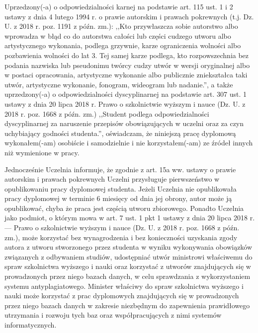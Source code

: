 \documentclass[11pt]{aghdpl}
\begin{document}
{\sf Uprzedzony(-a) o odpowiedzialności karnej na podstawie art. 115 ust. 1 i 2 ustawy z dnia 4 lutego 1994 r. o prawie autorskim i prawach pokrewnych (t.j. Dz. U. z 2018 r. poz. 1191 z późn. zm.): ,,Kto przywłaszcza sobie autorstwo albo wprowadza w błąd co do autorstwa całości lub części cudzego utworu albo artystycznego wykonania, podlega grzywnie, karze ograniczenia wolności albo pozbawienia wolności do lat 3. Tej samej karze podlega, kto rozpowszechnia bez podania nazwiska lub pseudonimu twórcy cudzy utwór w wersji oryginalnej albo w postaci opracowania, artystyczne wykonanie albo publicznie zniekształca taki utwór, artystyczne wykonanie, fonogram, wideogram lub nadanie.'', a także uprzedzony(-a) o odpowiedzialności dyscyplinarnej na podstawie art. 307 ust. 1 ustawy z dnia 20 lipca 2018 r. Prawo o szkolnictwie wyższym i nauce (Dz. U. z 2018 r. poz. 1668 z późn. zm.) ,,Student podlega odpowiedzialności dyscyplinarnej za naruszenie przepisów obowiązujących w uczelni oraz za czyn uchybiający godności studenta.'', oświadczam, że niniejszą pracę dyplomową wykonałem(-am) osobiście i samodzielnie i nie korzystałem(-am) ze źródeł innych niż wymienione w pracy.

\bigskip

Jednocześnie Uczelnia informuje, że zgodnie z art. 15a ww. ustawy o prawie autorskim i prawach pokrewnych Uczelni przysługuje pierwszeństwo w opublikowaniu pracy dyplomowej studenta. Jeżeli Uczelnia nie opublikowała pracy dyplomowej w terminie 6 miesięcy od dnia jej obrony, autor może ją opublikować, chyba że praca jest częścią utworu zbiorowego. Ponadto Uczelnia jako podmiot, o którym mowa w art. 7 ust. 1 pkt 1 ustawy z dnia 20 lipca 2018 r. --- Prawo o szkolnictwie wyższym i nauce (Dz. U. z 2018 r. poz. 1668 z późn. zm.), może korzystać bez wynagrodzenia i bez konieczności uzyskania zgody autora z utworu stworzonego przez studenta w wyniku wykonywania obowiązków związanych z odbywaniem studiów, udostępniać utwór ministrowi właściwemu do spraw szkolnictwa wyższego i nauki oraz korzystać z utworów znajdujących się w prowadzonych przez niego bazach danych, w celu sprawdzania z wykorzystaniem systemu antyplagiatowego. Minister właściwy do spraw szkolnictwa wyższego i nauki może korzystać z prac dyplomowych znajdujących się w prowadzonych przez niego bazach danych w zakresie niezbędnym do zapewnienia prawidłowego utrzymania i rozwoju tych baz oraz współpracujących z nimi systemów informatycznych.}

\vspace{14ex}
\end{document}
